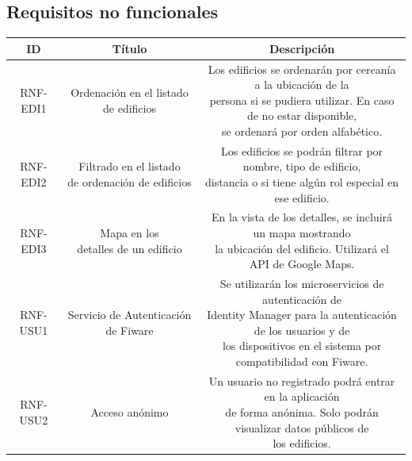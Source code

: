 \documentclass[12pt, a4paper, twoside]{article}
\begin{document}
 \subsection{Requisitos no funcionales}
 \begin{table}
  \footnotesize
  \begin{tabular}{ |c|c|c| }
  \hline
  ID       & Título & Descripción \\ \hline
  RNF-EDI1 & Ordenación en el listado de edificios 
  & \makecell[l]{Los edificios se ordenarán por cercanía a la ubicación de la \\
   persona si se pudiera utilizar. En caso de no estar disponible, \\
   se ordenará por orden alfabético. 
  }\\ \hline

  RNF-EDI2 & \makecell{
    Filtrado en el listado \\
    de ordenación de edificios}
  & \makecell[l]{Los edificios se podrán filtrar por nombre, tipo de edificio, \\
  distancia o si tiene algún rol especial en ese edificio.
  } \\ \hline

  RNF-EDI3 & \makecell{Mapa en los \\ detalles de un edificio}
  & \makecell[l]{En la vista de los detalles, se incluirá un mapa mostrando \\ 
  la ubicación del edificio. Utilizará el API de Google Maps.
   } \\ \hline

  RNF-USU1 & Servicio de Autenticación de Fiware 
  & \makecell[l]{Se utilizarán los microservicios de autenticación de \\
  Identity Manager para la autenticación de los usuarios y de \\
  los dispositivos en el sistema por compatibilidad con Fiware.
  } \\ \hline
  
  RNF-USU2 & Acceso anónimo 
  & \makecell[l]{Un usuario no registrado podrá entrar en la aplicación \\
   de forma anónima. Solo podrán visualizar datos públicos de \\
   los edificios.
   } \\ \hline
  

\end{tabular}
\end{table}
\end{document}
